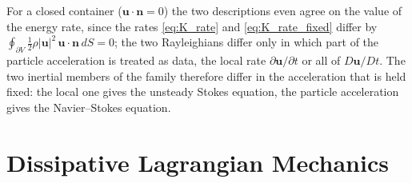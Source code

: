 \documentclass[12pt]{article}
\begin{document}
For a closed container ($\boldsymbol{u} \cdot \boldsymbol{n} = 0$) the two descriptions even agree on the value of the energy rate, since the rates \eqref{eq:K_rate} and \eqref{eq:K_rate_fixed} differ by $\oint_{\partial V} \tfrac{1}{2}\rho|\boldsymbol{u}|^2\, \boldsymbol{u}\cdot\boldsymbol{n}\, dS = 0$; the two Rayleighians differ only in which part of the particle acceleration is treated as data, the local rate $\partial\boldsymbol{u}/\partial t$ or all of $D\boldsymbol{u}/Dt$. The two inertial members of the family therefore differ in the acceleration that is held fixed: the local one gives the unsteady Stokes equation, the particle acceleration gives the Navier--Stokes equation.


\section{Dissipative Lagrangian Mechanics}
\label{sec:lagrangian}
\end{document}
